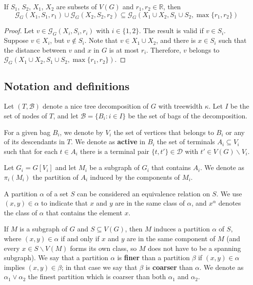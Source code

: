 \begin{fcorollary} \label{groupCor}
If \(S_1\), \(S_2\), \(X_1\), \(X_2\) are subsets of \(V(G)\) and \(r_1, r_2 \in \mathbb{R}\), then \[\mathcal{G}_G(X_1, S_1, r_1) \cup \mathcal{G}_G(X_2, S_2, r_2) \subseteq \mathcal{G}_G(X_1 \cup X_2, S_1 \cup S_2, \max\{r_1, r_2\})\]
\end{fcorollary}
\begin{proof}

Let \(v \in \mathcal{G}_G(X_i, S_i, r_i)\) with $i \in \{1,2\}$. The result is valid if \(v \in S_i\). Suppose \(v \in X_i\), but \(v \not\in S_i\). Note that \(v \in X_1 \cup X_2\), and there is \(x \in S_i\) such that the distance between \(v\) and \(x\) in \(G\) is at most \(r_i\). Therefore, \(v\) belongs to \(\mathcal{G}_G(X_1 \cup X_2, S_1 \cup S_2, \max\{r_1, r_2\})\).

\end{proof}


\subsection{Notation and definitions}

Let  \((T, \mathcal{B})\) denote a nice tree decomposition of \(G\) with treewidth \(\kappa\). Let \(I\) be the set of nodes of \(T\), and let \(\mathcal{B} = \{B_i \colon i \in I\}\) be the set of bags of the decomposition.

For a given bag \(B_i\), we denote by \(V_i\) the set of vertices that belongs to \(B_i\) or any of its descendants in \(T\). We denote as \textbf{active} in \(B_i\) the set of terminals \(A_i \subseteq V_i\) such that for each \(t \in A_i\) there is a terminal pair \(\{t, t'\} \in \mathcal{D}\) with \(t' \in V(G)\backslash V_i\).

Let \(G_i = G[V_i]\) and let \(M_i\) be a subgraph of \(G_i\) that contains \(A_i\). We denote as \(\pi_i(M_i)\) the partition of \(A_i\) induced by the components of \(M_i\).

A partition \(\alpha\) of a set \(S\) can be considered an equivalence relation on \(S\). We use \((x, y) \in \alpha\) to indicate that \(x\) and \(y\) are in the same class of \(\alpha\), and \(x^\alpha\) denotes the class of \(\alpha\) that contains the element \(x\).

If \(M\) is a subgraph of \(G\) and \(S \subseteq V(G)\), then \(M\) induces a partition \(\alpha\) of \(S\), where \((x, y) \in \alpha\) if and only if \(x\) and \(y\) are in the same component of \(M\) (and every \(x \in S \backslash V(M)\) forms its own class, so \(M\) does not have to be a spanning subgraph). We say that a partition \(\alpha\) is \textbf{finer} than a partition \(\beta\) if \((x, y) \in \alpha\) implies \((x, y) \in \beta\); in that case we say that \(\beta\) is \textbf{coarser} than \(\alpha\). We denote as \(\alpha_1 \vee \alpha_2\) the finest partition which is coarser than both \(\alpha_1\) and \(\alpha_2\).

